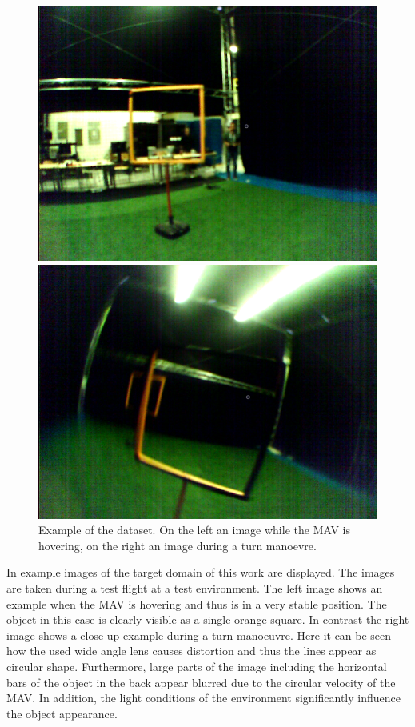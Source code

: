 \begin{figure}[bhtp]
	\begin{minipage}{0.49\textwidth}
		\includegraphics[width=\textwidth]{fig/real_cyberzoo2}
	\end{minipage}
	\begin{minipage}{0.49\textwidth}
		\includegraphics[width=\textwidth]{fig/real_cyberzoo1}
	\end{minipage}
	\label{fig:examples}
	\caption{Example of the  dataset. On the left an image while the \ac{MAV} is hovering, on the right an image during a turn manoevre.}
\end{figure}

In  example images of the target domain of this work are displayed. The images are taken during a test flight at a test environment. The left image shows an example when the \ac{MAV} is hovering and thus is in a very stable position. The object in this case is clearly visible as a single orange square. In contrast the right image shows a close up example during a turn manoeuvre. Here it can be seen how the used wide angle lens causes distortion and thus the lines appear as circular shape. Furthermore, large parts of the image including the horizontal bars of the object in the back appear blurred due to the circular velocity of the \ac{MAV}. In addition, the light conditions of the environment significantly influence the object appearance.

